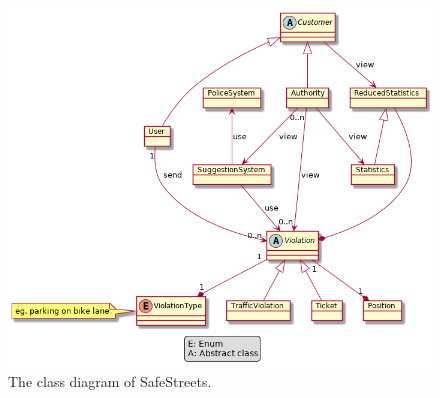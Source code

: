 \begin{figure}[htp]
	\centering
	\includegraphics[width=\textwidth]{images/Class Diagram.png}
	\caption{The class diagram of SafeStreets.}
	\label{fig:class-diagram}
\end{figure}

